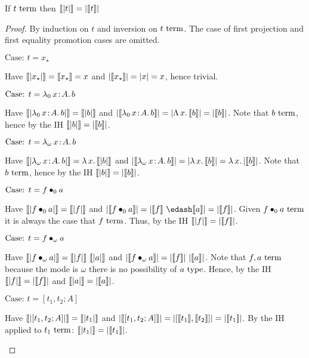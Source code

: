 \begin{lemma}
    \label{lem:4:sema_erasure}
    If $t~\textnormal{term}$ then $\llbracket |t| \rrbracket = |\llbracket t \rrbracket|$
\end{lemma}
\begin{proof}
    By induction on $t$ and inversion on $t~\textnormal{term}$.
    The case of first projection and first equality promotion cases are omitted.

    $\text{Case: }t = x_\star$
    \begin{proofcase}
        Have $\llbracket |x_\star| \rrbracket = \llbracket x_\star \rrbracket = x$ and $|\llbracket x_\star \rrbracket| = |x| = x$, hence trivial.
    \end{proofcase}

    $\text{Case: }t = {\lambda_0}\, x\! : \! A.\, b$
    \begin{proofcase}
        Have $\llbracket |{\lambda_0}\, x\! : \! A.\, b| \rrbracket = \llbracket |b| \rrbracket$ and $|\llbracket {\lambda_0}\, x\! : \! A.\, b \rrbracket| = |{\Lambda}\, x.\, \llbracket b \rrbracket| = |\llbracket b \rrbracket|$.
        Note that $b~\textnormal{term}$, hence by the IH $\llbracket |b| \rrbracket = |\llbracket b \rrbracket|$.
    \end{proofcase}

    $\text{Case: }t = {\lambda_\omega}\, x\! : \! A.\, b$
    \begin{proofcase}
        Have $\llbracket |{\lambda_\omega}\, x\! : \! A.\, b| \rrbracket = {\lambda}\, x.\, \llbracket |b| \rrbracket$ and $|\llbracket {\lambda_\omega}\, x\! : \! A.\, b \rrbracket| = |{\lambda}\, x.\, \llbracket b \rrbracket| = {\lambda}\, x.\, |\llbracket b \rrbracket|$.
        Note that $b~\textnormal{term}$, hence by the IH $\llbracket |b| \rrbracket = |\llbracket b \rrbracket|$.
    \end{proofcase}

    $\text{Case: }t = f \bullet_{0} a$
    \begin{proofcase}
        Have $\llbracket |f \bullet_{0} a| \rrbracket = \llbracket |f| \rrbracket$ and $|\sema{\app{f}{0}{a}}| = |\sema{f}\ \edash \sema{a}| = |\sema{f}|$.
        Given $f \bullet_{0} a~\textnormal{term}$ it is always the case that $f~\textnormal{term}$.
        Thus, by the IH $\llbracket |f| \rrbracket = |\llbracket f \rrbracket|$.
    \end{proofcase}

    $\text{Case: }t = f \bullet_{\omega} a$
    \begin{proofcase}
        Have $\llbracket |f \bullet_{\omega} a| \rrbracket = \llbracket |f| \rrbracket\ \llbracket |a| \rrbracket$ and $|\sema{\app{f}{\omega}{a}}| = |\sema{f}|\ |\sema{a}|$.
        Note that $f, a~\textnormal{term}$ because the mode is $\omega$ there is no possibility of $a~\textnormal{type}$.
        Hence, by the IH $\llbracket |f| \rrbracket = |\llbracket f \rrbracket|$ and $\llbracket |a| \rrbracket = |\llbracket a \rrbracket|$.
    \end{proofcase}

    $\text{Case: }t = [t_1, t_2; A]$
    \begin{proofcase}
        Have $\llbracket |[t_1, t_2; A]| \rrbracket = \llbracket |t_1| \rrbracket$ and $|\llbracket [t_1, t_2; A] \rrbracket| = |[\llbracket t_1 \rrbracket, \llbracket t_2 \rrbracket]| = |\llbracket t_1 \rrbracket|$.
        By the IH applied to $t_1~\textnormal{term}$: $\llbracket |t_1| \rrbracket = |\llbracket t_1 \rrbracket|$.
    \end{proofcase}


\end{proof}
